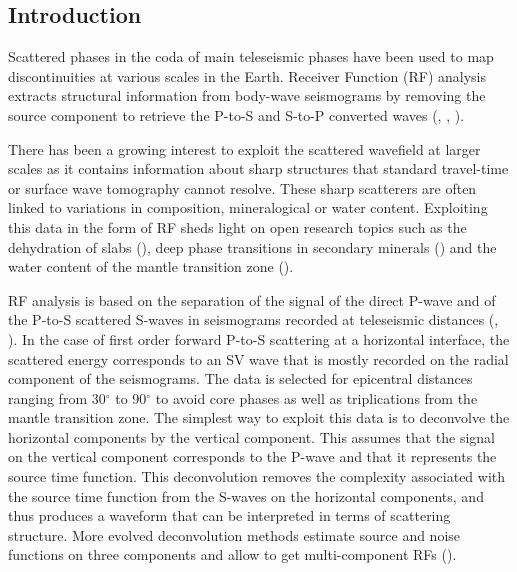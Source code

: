 \documentclass[9pt,a4paper]{article}
\numberwithin{equation}{section}
\begin{document}
\vspace{10mm}
\begin{multicols}{2}

\section{Introduction}

Scattered phases in the coda of main teleseismic phases have been used to map discontinuities at various scales in the Earth. 
Receiver Function (RF) analysis extracts structural information from body-wave seismograms by removing the source component to retrieve the P-to-S and S-to-P converted waves (\cite{lang_jgr_79}, \cite{bost_gji_99}, \cite{park_bssa_00}). 

There has been a growing interest to exploit the scattered wavefield at larger scales as it contains information about sharp structures that standard travel-time or surface wave tomography cannot resolve. 
These sharp scatterers are often linked to variations in composition, mineralogical or water content. 
Exploiting this data in the form of RF sheds light on open research topics such as the dehydration of slabs (\cite{tauz_epsl_17}), deep phase transitions in secondary minerals (\cite{cott_jgr_16}) and the water content of the mantle transition zone (\cite{zhen_sci_07}).

RF analysis is based on the separation of the signal of the direct P-wave  and of the P-to-S scattered S-waves in seismograms recorded at teleseismic distances (\cite{phin_jgr_64}, \cite{lang_jgr_79}). 
In the case of first order forward P-to-S scattering at a horizontal interface, the scattered energy corresponds to an SV wave that is mostly recorded on the radial component of the seismograms. 
The data is selected for epicentral distances ranging from 30$^{\circ}$ to 90$^{\circ}$ to avoid core phases as well as triplications from the mantle transition zone. 
The simplest way to exploit this data is to deconvolve the horizontal components by the vertical component. 
This assumes that the signal on the vertical component corresponds to the P-wave and that it represents the source time function.
This deconvolution removes the complexity associated with the source time function from the S-waves on the horizontal components, and thus produces a waveform that can be interpreted in terms of scattering structure. 
More evolved deconvolution methods estimate source and noise functions on three components and allow to get multi-component RFs (\cite{chen_gji_10}).


\end{multicols}
\end{document}

